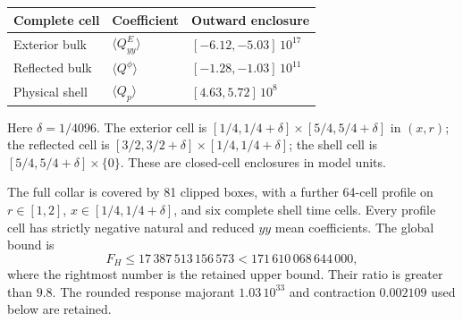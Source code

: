 \begin{center}
\begin{tabular}{lll}
\toprule
Complete cell & Coefficient & Outward enclosure \\
\midrule
Exterior bulk & $\langle Q^E_{yy}\rangle$ & $[-6.12,-5.03]\,10^{17}$ \\
Reflected bulk & $\langle Q^\phi\rangle$ & $[-1.28,-1.03]\,10^{11}$ \\
Physical shell & $\langle Q_p\rangle$ & $[4.63,5.72]\,10^8$ \\
\bottomrule
\end{tabular}
\end{center}
Here $\delta=1/4096$. The exterior cell is $[1/4,1/4+\delta]\times[5/4,5/4+\delta]$ in $(x,r)$; the reflected cell is $[3/2,3/2+\delta]\times[1/4,1/4+\delta]$; the shell cell is $[5/4,5/4+\delta]\times\{0\}$. These are closed-cell enclosures in model units.

The full collar is covered by 81 clipped boxes, with a further 64-cell profile on $r\in[1,2]$, $x\in[1/4,1/4+\delta]$, and six complete shell time cells. Every profile cell has strictly negative natural and reduced $yy$ mean coefficients. The global bound is
\[F_H\le17\,387\,513\,156\,573<171\,610\,068\,644\,000,\]
where the rightmost number is the retained upper bound. Their ratio is greater than $9.8$. The rounded response majorant $1.03\,10^{33}$ and contraction $0.002109$ used below are retained.
